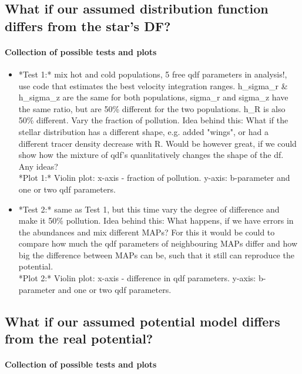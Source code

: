 \documentclass[12pt,preprint]{aastex}
\begin{document}
\subsection{What if our assumed distribution function differs from the star's DF?}

\paragraph{Collection of possible tests and plots}

\begin{itemize}
\item *Test 1:* mix hot and cold populations, 5 free qdf parameters in analysis!, use code that estimates the best velocity integration ranges. h\_sigma\_r \& h\_sigma\_z are the same for both populations, sigma\_r and sigma\_z have the same ratio, but are 50\% different for the two populations. h\_R is also 50\% different. Vary the fraction of pollution. Idea behind this: What if the stellar distribution has a different shape, e.g. added "wings", or had a different tracer density decrease with R. Would be however great, if we could show how the mixture of qdf's quanlitatively changes the shape of the df. Any ideas? \\
*Plot 1:* Violin plot: x-axis - fraction of pollution. y-axis: b-parameter and one or two qdf parameters.
\item *Test 2:* same as Test 1, but this time vary the degree of difference and make it 50\% pollution. Idea behind this: What happens, if we have errors in the abundances and mix different MAPs? For this it would be could to compare how much the qdf parameters of neighbouring MAPs differ and how big the difference between MAPs can be, such that it still can reproduce the potential. \\
*Plot 2:* Violin plot: x-axis - difference in qdf parameters. y-axis: b-parameter and one or two qdf parameters.
\end{itemize}

\subsection{What if our assumed potential model differs from the real potential?}

\paragraph{Collection of possible tests and plots}
\end{document}
